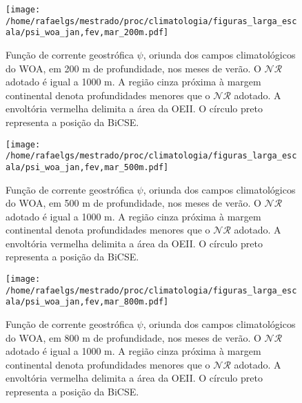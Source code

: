 \begin{figure}%
 \begin{center}
  \texttt{[image: /home/rafaelgs/mestrado/proc/climatologia/figuras\_larga\_escala/psi\_woa\_jan,fev,mar\_200m.pdf]}
 \end{center}
 \vspace{-.25cm}
 \renewcommand{\baselinestretch}{1}
 \caption{\label{fig:woa_verao200} \small Função de corrente geostrófica $\psi$, oriunda dos campos 
  climatológicos do WOA, em 200 m de profundidade, nos meses de verão. O 
  $\mathcal{NR}$ adotado é igual a 1000 m. A região cinza próxima à margem continental denota 
  profundidades menores que o $\mathcal{NR}$ adotado. A envoltória vermelha delimita a área da 
 OEII. O círculo preto representa a posição da BiCSE.}
\end{figure}

\begin{figure}%
 \begin{center}
  \texttt{[image: /home/rafaelgs/mestrado/proc/climatologia/figuras\_larga\_escala/psi\_woa\_jan,fev,mar\_500m.pdf]}
 \end{center}
 \vspace{-.25cm}
 \renewcommand{\baselinestretch}{1}
 \caption{\label{fig:woa_verao500} \small Função de corrente geostrófica $\psi$, oriunda dos campos 
  climatológicos do WOA, em 500 m de profundidade, nos meses de verão. O 
  $\mathcal{NR}$ adotado é igual a 1000 m. A região cinza próxima à margem continental denota 
  profundidades menores que o $\mathcal{NR}$ adotado. A envoltória vermelha delimita a área da 
 OEII. O círculo preto representa a posição da BiCSE.}
\end{figure}

\begin{figure}%
 \begin{center}
  \texttt{[image: /home/rafaelgs/mestrado/proc/climatologia/figuras\_larga\_escala/psi\_woa\_jan,fev,mar\_800m.pdf]}
 \end{center}
 \vspace{-.25cm}
 \renewcommand{\baselinestretch}{1}
 \caption{\label{fig:woa_verao800} \small Função de corrente geostrófica $\psi$, oriunda dos campos 
  climatológicos do WOA, em 800 m de profundidade, nos meses de verão. O 
  $\mathcal{NR}$ adotado é igual a 1000 m. A região cinza próxima à margem continental denota 
  profundidades menores que o $\mathcal{NR}$ adotado. A envoltória vermelha delimita a área da 
 OEII. O círculo preto representa a posição da BiCSE.}
\end{figure}
 
